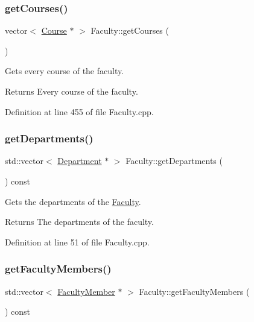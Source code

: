 \subsubsection{\texorpdfstring{get\+Courses()}{getCourses()}}
{\footnotesize\ttfamily vector$<$ \hyperlink{classCourse}{Course} $\ast$ $>$ Faculty\+::get\+Courses (\begin{DoxyParamCaption}{ }\end{DoxyParamCaption})}

Gets every course of the faculty. \begin{DoxyReturn}{Returns}
Every course of the faculty. 
\end{DoxyReturn}


Definition at line 455 of file Faculty.\+cpp.

\mbox{\label{classFaculty_acdf3fba82bf16b6e41fff7d1179d00d5}} 
\subsubsection{\texorpdfstring{get\+Departments()}{getDepartments()}}
{\footnotesize\ttfamily std\+::vector$<$ \hyperlink{classDepartment}{Department} $\ast$ $>$ Faculty\+::get\+Departments (\begin{DoxyParamCaption}{ }\end{DoxyParamCaption}) const}

Gets the departments of the \hyperlink{classFaculty}{Faculty}. \begin{DoxyReturn}{Returns}
The departments of the faculty. 
\end{DoxyReturn}


Definition at line 51 of file Faculty.\+cpp.

\mbox{\label{classFaculty_a92e85922b9fdcef7bce1e9d5018a09e7}} 
\subsubsection{\texorpdfstring{get\+Faculty\+Members()}{getFacultyMembers()}}
{\footnotesize\ttfamily std\+::vector$<$ \hyperlink{classFacultyMember}{Faculty\+Member} $\ast$ $>$ Faculty\+::get\+Faculty\+Members (\begin{DoxyParamCaption}{ }\end{DoxyParamCaption}) const}

